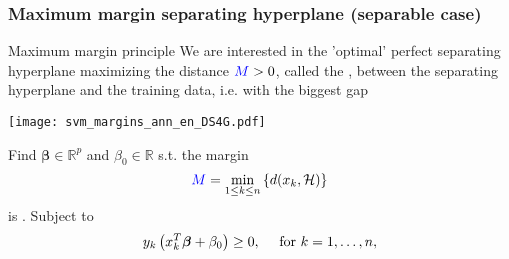\begin{frame}
   \frametitle{Maximum margin separating hyperplane (separable case)}




   \begin{block}{Maximum margin principle}
   We are interested in the 'optimal' perfect separating hyperplane maximizing the distance ${\textcolor{blue}{M}}>0$, called the ,
   between the separating hyperplane and the training data, i.e. with the biggest gap
    \end{block}
    \bigskip
   \begin{minipage}{.6\textwidth}
       \begin{center}
      \texttt{[image: svm\_margins\_ann\_en\_DS4G.pdf]}
   \end{center}
   \end{minipage}
 \begin{minipage}{.39\textwidth}
Find  $\boldsymbol{\beta}  \in \mathbb{R}^p$ and $\beta_0 \in \mathbb{R}$ s.t. the margin
    $$
      {\textcolor{blue}{M}}= \min_{1\le k \le n} \left\{ d(x_k,\mathcal{H}) \right\}
    $$
    is . Subject to
   $$\begin{displaystyle}       y_k  \left(  x^T_k \boldsymbol{\beta} + \beta_0 \right) \ge 0, \quad \text{ for } k=1,\ldots,n,
  \end{displaystyle}$$

   \end{minipage}

  \end{frame}
%
%
%
